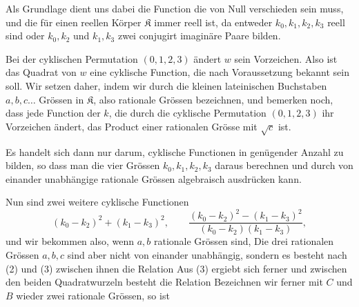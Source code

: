 Als Grundlage dient uns dabei die Function
die von Null verschieden sein muss, und die für einen reellen Körper $\mathfrak{K}$
immer reell ist, da entweder $k_0, k_1, k_2, k_3$ reell sind oder $k_0, k_2$ und
$k_1, k_3$ zwei conjugirt imaginäre Paare bilden.

Bei der cyklischen Permutation $(0, 1, 2, 3)$ ändert $w$ sein Vorzeichen. Also ist das
Quadrat von $w$ eine cyklische Function, die nach Voraussetzung bekannt sein soll. Wir
setzen daher, indem wir durch die kleinen lateinischen Buchstaben $a, b, c \ldots$
Grössen in $\mathfrak{K}$, also rationale Grössen bezeichnen,
und bemerken noch, dass jede Function der $k$, die durch die cyklische Permutation
$(0, 1, 2, 3)$ ihr Vorzeichen ändert, das Product einer rationalen Grösse mit
$\sqrt{c}$ ist.

Es handelt sich dann nur darum, cyklische Functionen in genügender Anzahl zu bilden, so
dass man die vier Grössen $k_0, k_1, k_2, k_3$ daraus berechnen und durch von einander
unabhängige rationale Grössen algebraisch ausdrücken kann.

Nun sind zwei weitere cyklische Functionen
\[
(k_0 - k_2)^2 + (k_1 - k_3)^2, \qquad \frac{(k_0 - k_2)^2 - (k_1 - k_3)^2}{(k_0 - k_2)(k_1 - k_3)},
\]
und wir bekommen also, wenn $a, b$ rationale Grössen sind,
Die drei rationalen Grössen $a, b, c$ sind aber nicht von einander unabhängig, sondern
es besteht nach (2) und (3) zwischen ihnen die Relation
Aus (3) ergiebt sich ferner
und zwischen den beiden Quadratwurzeln besteht die Relation
Bezeichnen wir ferner mit $C$ und $B$ wieder zwei rationale Grössen, so ist
